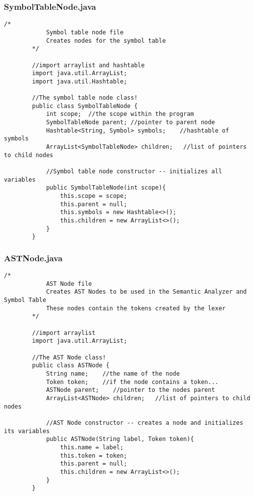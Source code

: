 \documentclass[letterpaper, 10pt,DIV=13]{scrartcl}
\numberwithin{equation}{section} %
\numberwithin{figure}{section} %
\numberwithin{table}{section} %
\begin{document}
\subsubsection*{SymbolTableNode.java}
    \lstset{numbers=left, numberstyle=\tiny, stepnumber=1, numbersep=5pt, basicstyle=\footnotesize\ttfamily}
    \begin{lstlisting}[frame=single, ]
        /*
            Symbol table node file
            Creates nodes for the symbol table
        */
        
        //import arraylist and hashtable
        import java.util.ArrayList;
        import java.util.Hashtable;
        
        //The symbol table node class!
        public class SymbolTableNode {
            int scope;  //the scope within the program
            SymbolTableNode parent; //pointer to parent node
            Hashtable<String, Symbol> symbols;    //hashtable of symbols
            ArrayList<SymbolTableNode> children;   //list of pointers to child nodes
        
            //Symbol table node constructor -- initializes all variables
            public SymbolTableNode(int scope){
                this.scope = scope;
                this.parent = null;
                this.symbols = new Hashtable<>();
                this.children = new ArrayList<>();
            }
        }
    \end{lstlisting}

\pagebreak

\subsubsection*{ASTNode.java}
    \lstset{numbers=left, numberstyle=\tiny, stepnumber=1, numbersep=5pt, basicstyle=\footnotesize\ttfamily}
    \begin{lstlisting}[frame=single, ]
        /*
            AST Node file
            Creates AST Nodes to be used in the Semantic Analyzer and Symbol Table
            These nodes contain the tokens created by the lexer
        */
        
        //import arraylist
        import java.util.ArrayList;
        
        //The AST Node class!
        public class ASTNode {
            String name;    //the name of the node
            Token token;    //if the node contains a token...
            ASTNode parent;    //pointer to the nodes parent
            ArrayList<ASTNode> children;   //list of pointers to child nodes
        
            //AST Node constructor -- creates a node and initializes its variables
            public ASTNode(String label, Token token){
                this.name = label;
                this.token = token;
                this.parent = null;
                this.children = new ArrayList<>();
            }   
        }
    \end{lstlisting}
\end{document}
